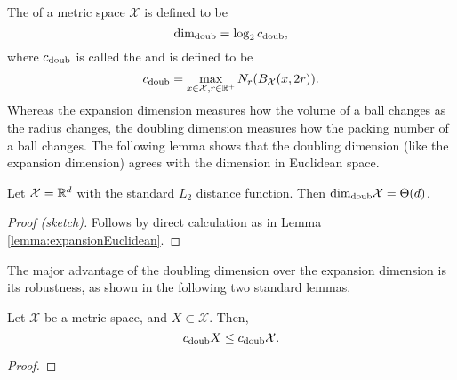 \documentclass[thesis.tex]{subfiles}
\newcommand{\set}[1]{\mathcal {#1}}
\newcommand{\radius}{r}
\newcommand{\doubdim}{\text{dim}_\textnormal{doub}}
\newcommand{\cdoub}{c_\textnormal{doub}}
\begin{document}
The  of a metric space $\set X$ is defined to be
\begin{equation}
    \doubdim = \log_2 \cdoub
    ,
\end{equation}
where $\cdoub$ is called the  and is defined to be
\begin{equation}
    \cdoub = \max_{x\in\set X, \radius\in\R^+} N_\radius(B_{\set X}(x,2\radius))
    .
\end{equation}
Whereas the expansion dimension measures how the volume of a ball changes as the radius changes,
the doubling dimension measures how the packing number of a ball changes.
The following lemma shows that the doubling dimension (like the expansion dimension) agrees with the dimension in Euclidean space.
\begin{lemma}
    \label{lemma:doubleEuclidean}
    Let $\set X=\R^d$ with the standard $L_2$ distance function.
    Then $\doubdim\set X=\Theta(d)$.
\end{lemma}
\begin{proof}[Proof (sketch)]
    Follows by direct calculation as in Lemma \ref{lemma:expansionEuclidean}.
\end{proof}
\noindent
The major advantage of the doubling dimension over the expansion dimension is its robustness,
as shown in the following two standard lemmas.


\begin{lemma}
    Let $\set X$ be a metric space, and $X\subset\set X$.
    Then,
    \begin{equation}
        \label{eq:cdoubinclusion}
        \cdoub X \le \cdoub \set X.
    \end{equation}
\end{lemma}

\begin{proof}
    \fixme{}
%
\end{proof}
\end{document}
